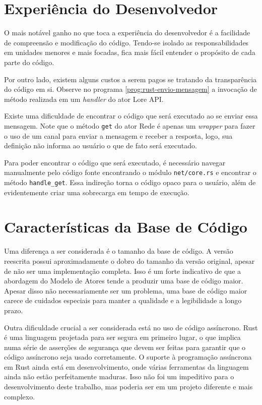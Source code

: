 \section{Experiência do Desenvolvedor}

O mais notável ganho no que toca a experiência do desenvolvedor é a facilidade de compreensão e modificação do código. Tendo-se isolado as responsabilidades em unidades menores e mais focadas, fica mais fácil entender o propósito de cada parte do código.

Por outro lado, existem alguns custos a serem pagos se tratando da transparência do código em si. Observe no programa \ref{prog:rust-envio-mensagem} a invocação de método realizada em um \emph{handler} do ator Lore API.

\begin{program}
  
  \caption{Exemplo de envio de mensagem para um ator.\label{prog:rust-envio-mensagem}}
\end{program}

Existe uma dificuldade de encontrar o código que será executado ao se enviar essa mensagem. Note que o método \texttt{get} do ator Rede é apenas um \emph{wrapper} para fazer o uso de um canal para enviar a mensagem e receber a resposta, logo, sua definição não informa ao usuário o que de fato será executado.

Para poder encontrar o código que será executado, é necessário navegar manualmente pelo código fonte encontrando o módulo \texttt{net/core.rs} e encontrar o método \texttt{handle\_get}. Essa indireção torna o código opaco para o usuário, além de evidentemente criar uma sobrecarga em tempo de execução.

\section{Características da Base de Código}

Uma diferença a ser considerada é o tamanho da base de código. A versão reescrita possui aproximadamente o dobro do tamanho da versão original, apesar de não ser uma implementação completa. Isso é um forte indicativo de que a abordagem do Modelo de Atores tende a produzir uma base de código maior. Apesar disso não necessariamente ser um problema, uma base de código maior carece de cuidados especiais para manter a qualidade e a legibilidade a longo prazo.

Outra dificuldade crucial a ser considerada está no uso de código assíncrono. Rust é uma linguagem projetada para ser segura em primeiro lugar, o que implica numa série de asserções de segurança que devem ser feitas para garantir que o código assíncrono seja usado corretamente. O suporte à programação assíncrona em Rust ainda está em desenvolvimento, onde várias ferramentas da linguagem ainda não estão perfeitamente maduras. Isso não foi um impeditivo para o desenvolvimento deste trabalho, mas poderia ser em um projeto diferente e mais complexo.
